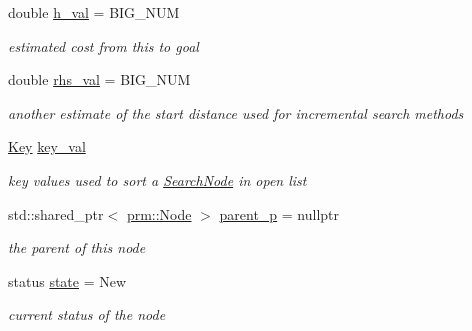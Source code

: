 \begin{DoxyCompactItemize}
double \hyperlink{structhsearch_1_1SearchNode_a8e25282237951762ced727eb0097abd9}{h\+\_\+val} = B\+I\+G\+\_\+\+N\+UM
\begin{DoxyCompactList}\small\item\em estimated cost from this to goal \end{DoxyCompactList}\item 
\mbox{\label{structhsearch_1_1SearchNode_a85d37c5e72aa9fd323f68467f60c5eb0}} 
double \hyperlink{structhsearch_1_1SearchNode_a85d37c5e72aa9fd323f68467f60c5eb0}{rhs\+\_\+val} = B\+I\+G\+\_\+\+N\+UM
\begin{DoxyCompactList}\small\item\em another estimate of the start distance used for incremental search methods \end{DoxyCompactList}\item 
\mbox{\label{structhsearch_1_1SearchNode_adc5f4fb44ebe73e41ffdc6c5d22c526b}} 
\hyperlink{structhsearch_1_1Key}{Key} \hyperlink{structhsearch_1_1SearchNode_adc5f4fb44ebe73e41ffdc6c5d22c526b}{key\+\_\+val}
\begin{DoxyCompactList}\small\item\em key values used to sort a \hyperlink{structhsearch_1_1SearchNode}{Search\+Node} in open list \end{DoxyCompactList}\item 
\mbox{\label{structhsearch_1_1SearchNode_ad651df3e918ceb891c294945e9e41598}} 
std\+::shared\+\_\+ptr$<$ \hyperlink{structprm_1_1Node}{prm\+::\+Node} $>$ \hyperlink{structhsearch_1_1SearchNode_ad651df3e918ceb891c294945e9e41598}{parent\+\_\+p} = nullptr
\begin{DoxyCompactList}\small\item\em the parent of this node \end{DoxyCompactList}\item 
\mbox{\label{structhsearch_1_1SearchNode_ae137174b53abd37ea386f3e3d9ebf462}} 
status \hyperlink{structhsearch_1_1SearchNode_ae137174b53abd37ea386f3e3d9ebf462}{state} = New
\begin{DoxyCompactList}\small\item\em current status of the node \end{DoxyCompactList}\end{DoxyCompactItemize}


